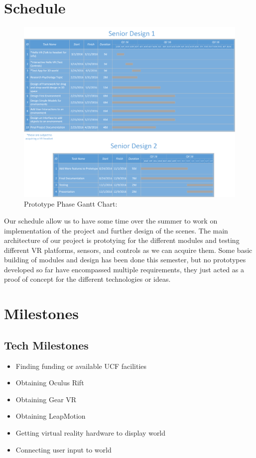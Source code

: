 \documentclass[a4paper,10pt]{article}
\begin{document}
	\section{Schedule}
	\begin{figure}[H]
	\includegraphics[width=\linewidth]{scheduleSR.png}
	\caption{Prototype Phase Gantt Chart:}
	\label{fig:pchart}
	\end{figure}
	Our schedule allow us to have some time over the summer to work on implementation of the project and further design of the scenes. The main architecture of our project is
	prototying for the different modules and testing different VR platforms, sensors, and controls as we can acquire them. Some basic building of modules and design has been done
	this semester, but no prototypes developed so far have encompassed multiple requirements, they just acted as a proof of concept for the different technologies or ideas.
	\pagebreak
	\section{Milestones}
	\subsection{Tech Milestones}
		\begin{itemize}
			\item Finding funding or available UCF facilities
			\item Obtaining Oculus Rift
			\item Obtaining Gear VR
			\item Obtaining LeapMotion
			\item Getting virtual reality hardware to display world
			\item Connecting user input to world
		\end{itemize}
\end{document}
